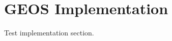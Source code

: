 \section{GEOS Implementation}
\label{section: Chapter4/implementation}

Test implementation section.